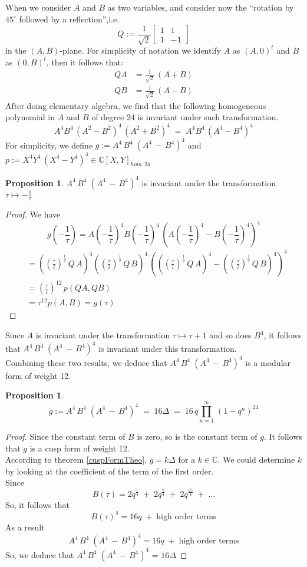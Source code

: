 \documentclass[12pt]{article}
\theoremstyle{definition}
\newtheorem{prop}[theorem]{Proposition}
\numberwithin{equation}{theorem}
\numberwithin{figure}{theorem}
\newcommand{\polyAB}[2]{\ensuremath{#1^4#2^4\,(#1^4 - #2^4)^4}}
\newcommand{\Complex}{\ensuremath{\mathbb{C}}}
\newcommand{\imaginary}{\ensuremath{i}}
\newcommand{\twoFourDegreeAB}{\ensuremath{A^4\,B^4\;(A^4 \,-\, B^4)^4}}
\begin{document}
When we consider $A$ and $B$ as two variables, and consider now the ``rotation by $45^{\circ}$ followed by a reflection'',i.e.
\[
	Q := \frac{1}{\sqrt{2}}
	\left [
	\begin{matrix}
		1 & 1\\
		1 & -1
	\end{matrix}
	\right]
\] in the $(A,B)$-plane. For simplicity of notation we identify $A$ as $(A,0)^t$ and $B$ as $(0,B)^t$, then it follows that:
\begin{align*}
	QA &= \frac{1}{\sqrt{2}}\,(A + B)\\
	QB &= \frac{1}{\sqrt{2}}\,(A - B) 
\end{align*}
After doing elementary algebra, we find that the following homogeneous polynomial in $A$ and $B$ of degree 24 is invariant under such transformation.
\[
	A^4B^4 \,(A^2 - B^2)^4 \, (A^2 + B^2)^4 \; = \; A^4B^4\,(A^4 - B^4)^4
\]
For simplicity, we define $g := {\twoFourDegreeAB}$  and $p := \polyAB{X}{Y} \in \Complex[X,Y]_{hom,24}$
\begin{prop}\label{twoFourABInvarProp}
	{\twoFourDegreeAB} is invariant under the transformation 
	$\tau \mapsto -\frac{1}{\tau}$
\end{prop}
\begin{proof}
We have
\[
	g(-\frac{1}{\tau}) = \polyAB{A(-\frac{1}{\tau})}{B(-\frac{1}{\tau})}
\]
\begin{align*}
 &= \polyAB{((\frac{\tau}{\imaginary})^{\frac{1}{2}}\,Q\,A)}{((\frac{\tau}{\imaginary})^{\frac{1}{2}}\,Q\,B)}\\
 &= (\frac{\tau}{\imaginary})^{12} \, p(QA, QB) \\
 &= \tau^{12}p(A,B) = g(\tau)
\end{align*}
\end{proof}
Since $A$ is invariant under the transformation $\tau \mapsto \tau + 1$ and so does $B^4$, it follows that {\twoFourDegreeAB} is invariant under this transformation.\\
Combining these two results, we deduce that $\twoFourDegreeAB$ is a modular form of weight 12.
\begin{prop}\label{twoFourDegABDelta}
\[
	g := {\twoFourDegreeAB} \;= \; 16 \Delta \;= \; 16\,q\prod_{n = 1}^{\infty}\,(1 - q^n)^{24}
\]
\end{prop}
\begin{proof}
Since the constant term of $B$ is zero, so is the constant term of $g$. It follows that $g$ is a cusp form of weight 12. \\
According to theorem \ref{cuspFormTheo},  $g = k \Delta$ for a $k \in \Complex$. We could determine $k$ by looking at the coefficient of the term of the first order.\\
Since
\[
	B(\tau) = 2 q^{\frac{1}{4}} \; + \; 2q^{\frac{9}{4}} \;+\; 2q^{\frac{25}{4}} \; + \; \ldots 
\]
So, it follows that
\[
	B(\tau)^4 = 16 q \; + \; \mbox{high order terms}
\]
As a result
\[
	\twoFourDegreeAB = 16 q \; + \; \mbox{high order terms} 
\]
So, we deduce that $\twoFourDegreeAB$ = $16 \Delta$
\end{proof}
\end{document}
